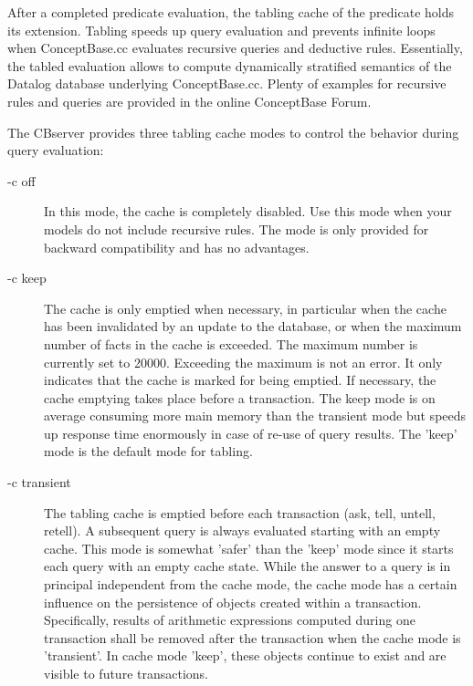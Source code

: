 After a completed predicate evaluation, the tabling cache of the predicate holds
its extension. Tabling speeds up query evaluation and
prevents infinite loops when ConceptBase.cc evaluates
recursive queries and deductive rules. Essentially, the
tabled evaluation allows to compute dynamically stratified
semantics of the Datalog database underlying ConceptBase.cc.
Plenty of examples for recursive rules and queries are provided
in the online ConceptBase Forum.

The CBserver provides three tabling cache modes to control the
behavior during query evaluation:

\begin{description}

\item[-c off] In this mode, the cache is completely disabled. Use this mode
when your models do not include recursive rules.
The mode is only provided for backward compatibility and has no advantages.

\item[-c keep] The cache is only emptied when necessary, in particular when the cache
has been invalidated by an update to the database, or when the maximum number
of facts in the cache is exceeded. The maximum number is currently set
to 20000. Exceeding the maximum is not an error. It only indicates that the cache
is marked for being emptied. If necessary, the cache emptying takes place before
a transaction. The keep mode is on average consuming more main memory than the
transient mode but speeds up response time enormously in case of re-use of query
results. The 'keep' mode is the default mode for tabling.

\item[-c transient] The tabling cache is emptied before
each transaction (ask, tell, untell, retell). A subsequent query is always
evaluated starting with an empty cache. This mode is somewhat 'safer' than the
'keep' mode since it starts each query with an empty cache state. 
While the answer to a query is in principal independent from the cache mode,
the cache mode has a certain influence on the persistence of objects created
within a transaction. Specifically, results of arithmetic expressions 
computed during one transaction shall be removed after the transaction
when the cache mode is 'transient'. In cache mode 'keep', these objects
continue to exist and are visible to future transactions. 

\end{description}

